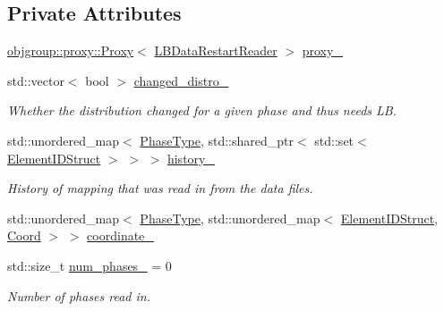 \subsection*{Private Attributes}
\begin{DoxyCompactItemize}
\item 
\hyperlink{structvt_1_1objgroup_1_1proxy_1_1_proxy}{objgroup\+::proxy\+::\+Proxy}$<$ \hyperlink{structvt_1_1vrt_1_1collection_1_1balance_1_1_l_b_data_restart_reader}{L\+B\+Data\+Restart\+Reader} $>$ \hyperlink{structvt_1_1vrt_1_1collection_1_1balance_1_1_l_b_data_restart_reader_a65b1a0379efca529b3ce6cff045e047a}{proxy\+\_\+}
\item 
std\+::vector$<$ bool $>$ \hyperlink{structvt_1_1vrt_1_1collection_1_1balance_1_1_l_b_data_restart_reader_ade00b90a9eeee5d3dd05edee5d24e5a9}{changed\+\_\+distro\+\_\+}
\begin{DoxyCompactList}\small\item\em Whether the distribution changed for a given phase and thus needs LB. \end{DoxyCompactList}\item 
std\+::unordered\+\_\+map$<$ \hyperlink{namespacevt_a46ce6733d5cdbd735d561b7b4029f6d7}{Phase\+Type}, std\+::shared\+\_\+ptr$<$ std\+::set$<$ \hyperlink{namespacevt_1_1vrt_1_1collection_1_1balance_a9f5b53fafb270212279a4757d2c4cd28}{Element\+I\+D\+Struct} $>$ $>$ $>$ \hyperlink{structvt_1_1vrt_1_1collection_1_1balance_1_1_l_b_data_restart_reader_a5221a190363be1cdc6940778ee0ed22b}{history\+\_\+}
\begin{DoxyCompactList}\small\item\em History of mapping that was read in from the data files. \end{DoxyCompactList}\item 
std\+::unordered\+\_\+map$<$ \hyperlink{namespacevt_a46ce6733d5cdbd735d561b7b4029f6d7}{Phase\+Type}, std\+::unordered\+\_\+map$<$ \hyperlink{namespacevt_1_1vrt_1_1collection_1_1balance_a9f5b53fafb270212279a4757d2c4cd28}{Element\+I\+D\+Struct}, \hyperlink{structvt_1_1vrt_1_1collection_1_1balance_1_1_l_b_data_restart_reader_1_1_coord}{Coord} $>$ $>$ \hyperlink{structvt_1_1vrt_1_1collection_1_1balance_1_1_l_b_data_restart_reader_ab24e7539668dcbe68d141c2be45ad2d1}{coordinate\+\_\+}
\item 
std\+::size\+\_\+t \hyperlink{structvt_1_1vrt_1_1collection_1_1balance_1_1_l_b_data_restart_reader_a8a9f63f593ce73388ca9b2da4b705b98}{num\+\_\+phases\+\_\+} = 0
\begin{DoxyCompactList}\small\item\em Number of phases read in. \end{DoxyCompactList}\end{DoxyCompactItemize}
